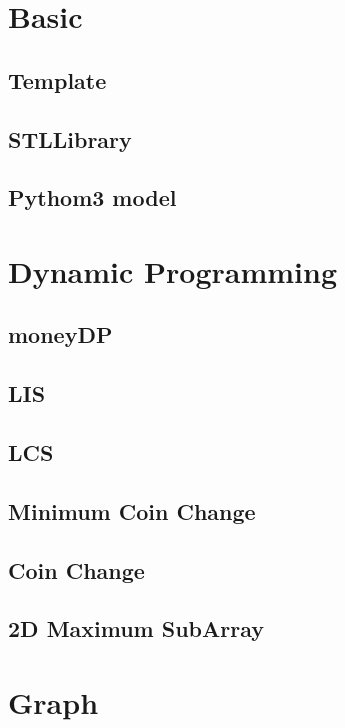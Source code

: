 \section{Basic}
\subsection{Template}

\subsection{STLLibrary}

\subsection{Pythom3 model}


\section{Dynamic Programming}
\subsection{moneyDP}

\subsection{LIS}

\subsection{LCS}

\subsection{Minimum Coin Change}

\subsection{Coin Change}

\subsection{2D Maximum SubArray}


\section{Graph}
